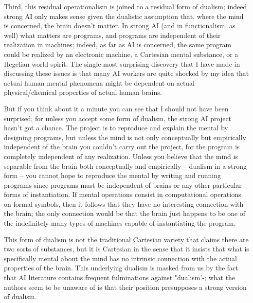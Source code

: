Third, this residual operationalism is joined to a residual form of dualism; indeed strong AI only makes sense
given the dualistic assumption that, where the mind is concerned, the brain doesn't matter. In strong AI (and in
functionalism, as well) what matters are programs, and programs are independent of their realization in
machines; indeed, as far as AI is concerned, the same program could be realized by an electronic machine, a
Cartesian mental substance, or a Hegelian world spirit. The single most surprising discovery that I have made in
discussing these issues is that many AI workers are quite shocked by my idea that actual human mental
phenomena might be dependent on actual physical/chemical properties of actual human brains.

But if you think about it a minute you can see that I should not have been surprised; for unless you accept some form of dualism, the strong AI project hasn't got a chance. The project is to reproduce and explain the mental
by designing programs, but unless the mind is not only conceptually but empirically independent of the brain you
couldn't carry out the project, for the program is completely independent of any realization. Unless you believe
that the mind is separable from the brain both conceptually and empirically -- dualism in a strong form -- you
cannot hope to reproduce the mental by writing and running programs since programs must be independent of
brains or any other particular forms of instantiation. If mental operations consist in computational operations on
formal symbols, then it follows that they have no interesting connection with the brain; the only connection
would be that the brain just happens to be one of the indefinitely many types of machines capable of instantiating
the program.

This form of dualism is not the traditional Cartesian variety that claims there are two sorts of substances, but it
is Cartesian in the sense that it insists that what is specifically mental about the mind has no intrinsic connection
with the actual properties of the brain. This underlying dualism is masked from us by the fact that AI literature
contains frequent fulminations against "dualism'-; what the authors seem to be unaware of is that their position
presupposes a strong version of dualism.

